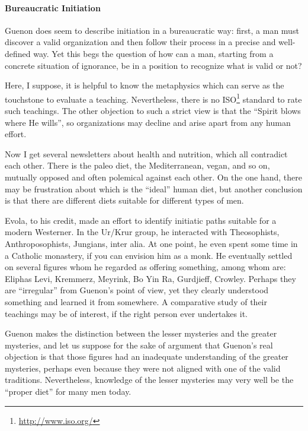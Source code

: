 \paragraph{Bureaucratic Initiation}


Guenon does seem to describe initiation in a bureaucratic way: first, a man must discover a valid organization and then follow their process in a precise and well-defined way. Yet this begs the question of how can a man, starting from a concrete situation of ignorance, be in a position to recognize what is valid or not?

Here, I suppose, it is helpful to know the metaphysics which can serve as the touchstone to evaluate a teaching. Nevertheless, there is no ISO\footnote{\url{http://www.iso.org/}} standard to rate such teachings. The other objection to such a strict view is that the ``Spirit blows where He wills'', so organizations may decline and arise apart from any human effort.

Now I get several newsletters about health and nutrition, which all contradict each other. There is the paleo diet, the Mediterranean, vegan, and so on, mutually opposed and often polemical against each other. On the one hand, there may be frustration about which is the ``ideal'' human diet, but another conclusion is that there are different diets suitable for different types of men.

Evola, to his credit, made an effort to identify initiatic paths suitable for a modern Westerner. In the Ur/Krur group, he interacted with Theosophists, Anthroposophists, Jungians, inter alia. At one point, he even spent some time in a Catholic monastery, if you can envision him as a monk. He eventually settled on several figures whom he regarded as offering something, among whom are: Eliphas Levi, Kremmerz, Meyrink, Bo Yin Ra, Gurdjieff, Crowley. Perhaps they are ``irregular'' from Guenon's point of view, yet they clearly understood something and learned it from somewhere. A comparative study of their teachings may be of interest, if the right person ever undertakes it.

Guenon makes the distinction between the lesser mysteries and the greater mysteries, and let us suppose for the sake of argument that Guenon's real objection is that those figures had an inadequate understanding of the greater mysteries, perhaps even because they were not aligned with one of the valid traditions. Nevertheless, knowledge of the lesser mysteries may very well be the ``proper diet'' for many men today.

